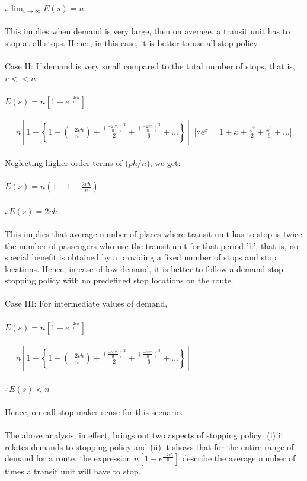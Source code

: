 $ \therefore \lim_{v \to \infty} E(s) = n $\\\\
This implies when demand is very large, then on average, a transit unit has to stop at all stops. Hence, in this case, it is better to use all stop policy.\\\\
Case II: If demand is very small compared to the total number of stops, that is, $ v << n $\\\\
$ E(s) = n \left[1 - e^\frac{-2vh}{n}\right] $\\\\
$ = n \left[ 1 -\left\{ 1 + \left( \frac{-2vh}{n} \right) + \frac{(\frac{-2vh}{n})^2}{2} + \frac{(\frac{-2vh}{n})^3}{6} + ... \right\} \right] $ [$ \because e^x = 1 + x + \frac{x^2}{2} + \frac{x^3}{6} + ... $]\\\\
Neglecting higher order terms of ($ ph/n $), we get:\\\\
$ E(s) = n \left( 1 - 1 + \frac{2vh}{n} \right) $\\\\
$ \therefore E(s) = 2vh $\\\\
This implies that average number of places where transit unit has to stop is twice the number of passengers who use the transit unit for that period 'h', that is, no special benefit is obtained by a providing a fixed number of stops and stop locations. Hence, in case of low demand, it is better to follow a demand stop stopping policy with no predefined stop locations on the route.\\\\
Case III: For intermediate values of demand,\\\\
$ E(s) = n \left[1 - e^\frac{-2vh}{n}\right] $\\\\
$ = n \left[ 1 -\left\{ 1 + \left( \frac{-2vh}{n} \right) + \frac{(\frac{-2vh}{n})^2}{2} + \frac{(\frac{-2vh}{n})^3}{6} + ... \right\} \right] $\\\\
$ \therefore E(s) < n $\\\\
Hence, on-call stop makes sense for this scenario.\\\\
The above analysis, in effect, brings out two aspects of stopping policy: (i) it relates demands to stopping policy and (ii) it shows that for the entire range of demand for a route, the expression $n\left[1 - e^\frac{-2vh}{n}\right]$ describe the average number of times a transit unit will have to stop.
\begin{center}
\end{center}
